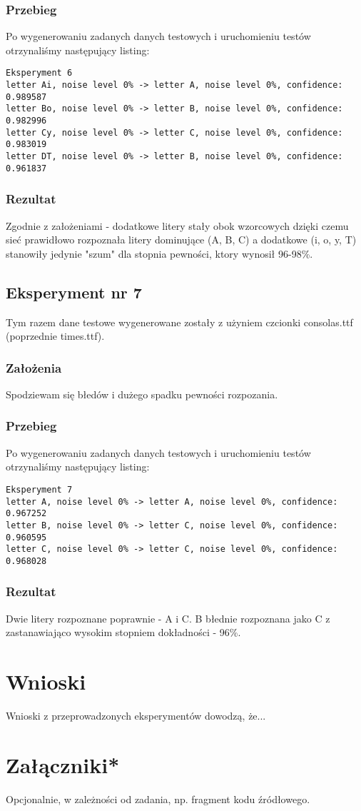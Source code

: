 \documentclass[12pt]{article}
\begin{document}
\subsubsection{Przebieg}
Po wygenerowaniu zadanych danych testowych i uruchomieniu testów otrzynaliśmy następujący listing:
\begin{verbatim}
Eksperyment 6
letter Ai, noise level 0% -> letter A, noise level 0%, confidence: 0.989587
letter Bo, noise level 0% -> letter B, noise level 0%, confidence: 0.982996
letter Cy, noise level 0% -> letter C, noise level 0%, confidence: 0.983019
letter DT, noise level 0% -> letter B, noise level 0%, confidence: 0.961837
\end{verbatim}
\subsubsection{Rezultat}
Zgodnie z założeniami - dodatkowe litery stały obok wzorcowych dzięki czemu sieć prawidłowo rozpoznała litery dominujące (A, B, C) a dodatkowe (i, o, y, T) stanowiły jedynie "szum" dla stopnia pewności, ktory wynosił 96-98\%.\\

\subsection{Eksperyment nr 7}
Tym razem dane testowe wygenerowane zostały z użyniem czcionki consolas.ttf (poprzednie times.ttf).
\subsubsection{Założenia}
Spodziewam się błedów i dużego spadku pewności rozpozania.
\subsubsection{Przebieg}
Po wygenerowaniu zadanych danych testowych i uruchomieniu testów otrzynaliśmy następujący listing:
\begin{verbatim}
Eksperyment 7
letter A, noise level 0% -> letter A, noise level 0%, confidence: 0.967252
letter B, noise level 0% -> letter C, noise level 0%, confidence: 0.960595
letter C, noise level 0% -> letter C, noise level 0%, confidence: 0.968028
\end{verbatim}
\subsubsection{Rezultat}
Dwie litery rozpoznane poprawnie - A i C. B błednie rozpoznana jako C z zastanawiająco wysokim stopniem dokładności - 96\%.
\section{Wnioski}

Wnioski z przeprowadzonych eksperymentów dowodzą, że...


\section{Załączniki*}

Opcjonalnie, w zależności od zadania,
np. fragment kodu źródłowego.

\renewcommand\refname{Bibliografia}


\end{document}

